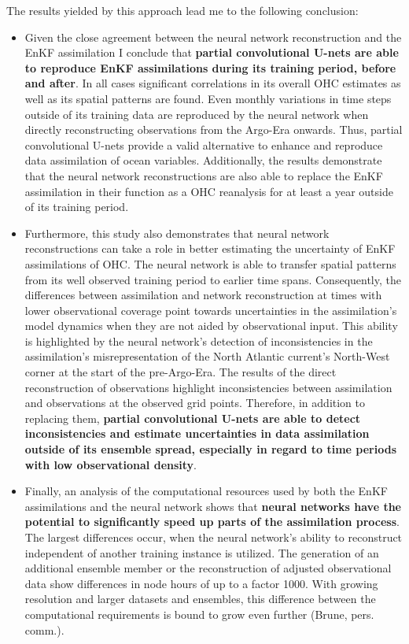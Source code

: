 \documentclass[Masterarbeit.tex]{subfile}
\begin{document}
	The results yielded by this approach lead me to the following conclusion:
	\begin{itemize}
		\item Given the close agreement between the neural network reconstruction and the EnKF assimilation I conclude that \textbf{partial convolutional U-nets are able to reproduce EnKF assimilations during its training period, before and after}. In all cases significant correlations in its overall OHC estimates as well as its spatial patterns are found. Even monthly variations in time steps outside of its training data are reproduced by the neural network when directly reconstructing observations from the Argo-Era onwards. Thus, partial convolutional U-nets provide a valid alternative to enhance and reproduce data assimilation of ocean variables. Additionally, the results demonstrate that the neural network reconstructions are also able to replace the EnKF assimilation in their function as a OHC reanalysis for at least a year outside of its training period. \\
		\item Furthermore, this study also demonstrates that neural network reconstructions can take a role in better estimating the uncertainty of EnKF assimilations of OHC. The neural network is able to transfer spatial patterns from its well observed training period to earlier time spans. Consequently, the differences between assimilation and network reconstruction at times with lower observational coverage point towards uncertainties in the assimilation's model dynamics when they are not aided by observational input. This ability is highlighted by the neural network's detection of inconsistencies in the assimilation's misrepresentation of the North Atlantic current's North-West corner at the start of the pre-Argo-Era. The results of the direct reconstruction of observations highlight inconsistencies between assimilation and observations at the observed grid points. Therefore, in addition to replacing them, \textbf{partial convolutional U-nets are able to detect inconsistencies and estimate uncertainties in data assimilation outside of its ensemble spread, especially in regard to time periods with low observational density}.\\
		\item Finally, an analysis of the computational resources used by both the EnKF assimilations and the neural network shows that \textbf{neural networks have the potential to significantly speed up parts of the assimilation process}. The largest differences occur, when the neural network's ability to reconstruct independent of another training instance is utilized. The generation of an additional ensemble member or the reconstruction of adjusted observational data show differences in node hours of up to a factor 1000. With growing resolution and larger datasets and ensembles, this difference between the computational requirements is bound to grow even further (Brune, pers. comm.). \\
	\end{itemize}
	
\end{document}
